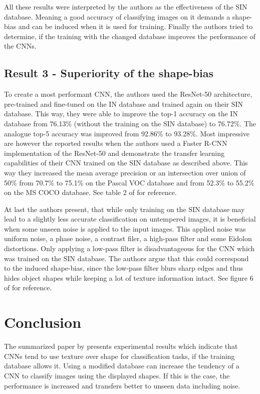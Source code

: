 \documentclass[runningheads,a4paper]{llncs}
\begin{document}
All these results were interpreted by the authors as the effectiveness of the SIN database. Meaning a good accuracy of classifying images on it demands a shape-bias and can be induced when it is used for training. Finally the authors tried to determine, if the training with the changed database improves the performance of the CNNs.

\subsection{Result 3 - Superiority of the shape-bias}

To create a most performant CNN, the authors used the ResNet-50 architecture, pre-trained and fine-tuned on the IN database and trained again on their SIN database. This way, they were able to improve the top-1 accuracy on the IN database from 76.13\% (without the training on the SIN database) to 76.72\%. The analogue top-5 accuracy was improved from 92.86\% to 93.28\%. Most impressive are however the reported results when the authors used a Faster R-CNN \citep{ren2015faster} implementation of the ResNet-50 and demonstrate the transfer learning capabilities of their CNN trained on the SIN database as described above. This way they increased the mean average precision or an intersection over union of 50\% from 70.7\% to 75.1\% on the Pascal VOC database and from 52.3\% to 55.2\% on the MS COCO database. See table 2 of \citet{geirhos2018imagenet} for reference.


At last the authors present, that while only training on the SIN database may lead to a slightly less accurate classification on untempered images, it is beneficial when some unseen noise is applied to the input images. This applied noise was uniform noise, a phase noise, a contrast filer, a high-pass filter and some Eidolon distortions. Only applying a low-pass filter is disadvantageous for the CNN which was trained on the SIN database. The authors argue that this could correspond to the 
induced shape-bias, since the low-pass filter blurs sharp edges and thus hides object shapes while keeping a lot of texture information intact. See figure 6 of \citet{geirhos2018imagenet} for reference.

\section{Conclusion}
The summarized paper by \citet{geirhos2018imagenet} presents experimental results which indicate that CNNs tend to use texture over shape for classification tasks, if the training database allows it. Using a modified database can increase the tendency of a CNN to classify images using the displayed shapes. If this is the case, the performance is increased and transfers better to unseen data including noise.
\end{document}
